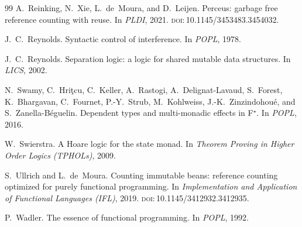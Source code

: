 \documentclass[11pt,a4paper]{article}
\theoremstyle{definition}
\theoremstyle{plain}
\newcommand{\doi}[1]{\textsc{doi}:\,#1}
\begin{document}
\begin{thebibliography}{99}
A.~Reinking, N.~Xie, L.~de~Moura, and D.~Leijen.
\newblock Perceus: garbage free reference counting with reuse.
\newblock In \emph{PLDI}, 2021.
\newblock \doi{10.1145/3453483.3454032}.

J.~C.~Reynolds.
\newblock Syntactic control of interference.
\newblock In \emph{POPL}, 1978.

J.~C.~Reynolds.
\newblock Separation logic: a logic for shared mutable data structures.
\newblock In \emph{LICS}, 2002.

N.~Swamy, C.~Hri\c{t}cu, C.~Keller, A.~Rastogi, A.~Delignat-Lavaud, S.~Forest,
K.~Bhargavan, C.~Fournet, P.-Y.~Strub, M.~Kohlweiss, J.-K.~Zinzindohou\'e, and
S.~Zanella-B\'eguelin.
\newblock Dependent types and multi-monadic effects in F$^{\star}$.
\newblock In \emph{POPL}, 2016.

W.~Swierstra.
\newblock A Hoare logic for the state monad.
\newblock In \emph{Theorem Proving in Higher Order Logics (TPHOLs)}, 2009.

S.~Ullrich and L.~de~Moura.
\newblock Counting immutable beans: reference counting optimized for purely
functional programming.
\newblock In \emph{Implementation and Application of Functional Languages
(IFL)}, 2019.
\newblock \doi{10.1145/3412932.3412935}.

P.~Wadler.
\newblock The essence of functional programming.
\newblock In \emph{POPL}, 1992.

\end{thebibliography}
\end{document}
